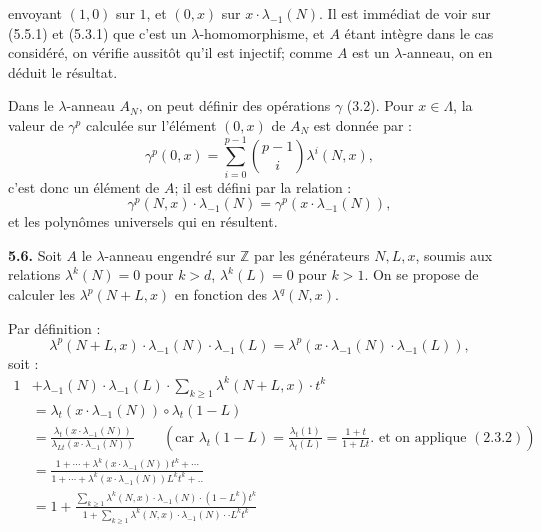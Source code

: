 envoyant \((1,0)\) sur \(1\), et \((0,x)\) sur \(x\cdot\lambda_{-1}(N)\). Il est immédiat de voir sur (5.5.1) et (5.3.1) que c'est un \(\lambda\)-homomorphisme, et \(A\) étant intègre dans le cas considéré, on vérifie aussitôt qu'il est injectif; comme \(A\) est un \(\lambda\)-anneau, on en déduit le résultat.

Dans le \(\lambda\)-anneau \(A_N\), on peut définir des opérations \(\gamma\) (3.2). Pour \(x\in\Lambda\), la valeur de \(\gamma^p\) calculée sur l'élément \((0,x)\) de \(A_N\) est donnée par :
\[
  \gamma^p(0,x)=\sum_{i=0}^{p-1}\binom{p-1}{i}\lambda^i(N,x),
\]
c'est donc un élément de \(A\); il est défini par la relation :
\begin{equation}\tag{5.5.4}
  \gamma^p(N,x)\cdot\lambda_{-1}(N)=\gamma^p(x\cdot\lambda_{-1}(N)),
\end{equation}
et les polynômes universels qui en résultent.


\textbf{5.6.} Soit \(A\) le \(\lambda\)-anneau engendré sur \(\mathbb Z\) par les générateurs \(N,L,x\), soumis aux relations \(\lambda^k(N)=0\) pour \(k>d\), \(\lambda^k(L)=0\) pour \(k>1\). On se propose de calculer les \(\lambda^p(N+L,x)\) en fonction des \(\lambda^q(N,x)\).

Par définition :
\[
  \lambda^p(N+L,x)\cdot\lambda_{-1}(N)\cdot\lambda_{-1}(L)
  =\lambda^p(x\cdot\lambda_{-1}(N)\cdot\lambda_{-1}(L)),
\]
soit :
\[
\begin{aligned}
1&+\lambda_{-1}(N)\cdot\lambda_{-1}(L)\cdot\sum_{k\ge1}\lambda^k(N+L,x)\cdot t^k \\
 &=\lambda_t(x\cdot\lambda_{-1}(N))\circ \lambda_t(1-L) \\
 &=\frac{\lambda_t(x\cdot\lambda_{-1}(N))}{\lambda_{Lt}(x\cdot\lambda_{-1}(N))}
   \qquad\left(\text{car }\lambda_t(1-L)=\frac{\lambda_t(1)}{\lambda_t(L)}=\frac{1+t}{1+Lt}.\text{ et on applique }(2.3.2)\right) \\
 &=\frac{1+\cdots+\lambda^k(x\cdot\lambda_{-1}(N))t^k+\cdots}{1+\cdots+\lambda^k(x\cdot\lambda_{-1}(N))L^k t^k+..} \\
 &=1+\frac{\sum_{k\ge1}\lambda^k(N,x)\cdot\lambda_{-1}(N)\cdot(1-L^k)t^k}{1+\sum_{k\ge1}\lambda^k(N,x)\cdot\lambda_{-1}(N)\cdot\cdot L^k t^k}
\end{aligned}
\]
